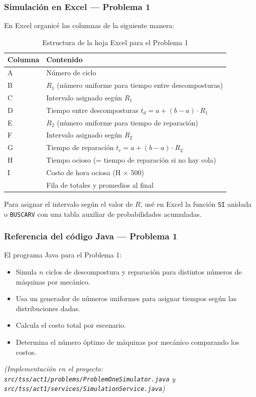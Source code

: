 \documentclass[12pt,a4paper]{article}
\begin{document}
\subsubsection{Simulación en Excel — Problema 1}

En Excel organicé las columnas de la siguiente manera:

\begin{table}[H]
\centering
\caption{Estructura de la hoja Excel para el Problema 1}
\begin{tabular}{>{\ttfamily}l l}
\toprule
\textbf{Columna} & \textbf{Contenido} \\
\midrule
A & Número de ciclo \\
B & $R_1$ (número uniforme para tiempo entre descomposturas) \\
C & Intervalo asignado según $R_1$ \\
D & Tiempo entre descomposturas $t_d = a + (b-a) \cdot R_1$ \\
E & $R_2$ (número uniforme para tiempo de reparación) \\
F & Intervalo asignado según $R_2$ \\
G & Tiempo de reparación $t_r = a + (b-a) \cdot R_2$ \\
H & Tiempo ocioso (= tiempo de reparación si no hay cola) \\
I & Costo de hora ociosa (H $\times$ 500) \\
\midrule
& Fila de totales y promedios al final \\
\bottomrule
\end{tabular}
\end{table}

Para asignar el intervalo según el valor de $R$, usé en Excel la función \texttt{SI} anidada o \texttt{BUSCARV} con una tabla auxiliar de probabilidades acumuladas.

\subsubsection{Referencia del código Java — Problema 1}

\begin{javabox}
El programa Java para el Problema 1:
\begin{itemize}
  \item Simula $n$ ciclos de descompostura y reparación para distintos números de máquinas por mecánico.
  \item Usa un generador de números uniformes para asignar tiempos según las distribuciones dadas.
  \item Calcula el costo total por escenario.
  \item Determina el número óptimo de máquinas por mecánico comparando los costos.
\end{itemize}
\textit{(Implementación en el proyecto: \texttt{src/tss/act1/problems/ProblemOneSimulator.java} y \texttt{src/tss/act1/services/SimulationService.java})}
\end{javabox}
\end{document}
